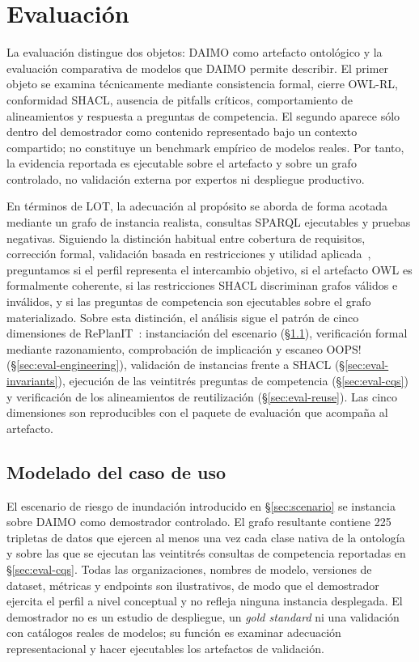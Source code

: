 \documentclass[Afour,sagev,times]{sagej}
\begin{document}
\section{Evaluación}\label{sec:eval}

La evaluación distingue dos objetos: DAIMO como artefacto ontológico y la evaluación comparativa de modelos que DAIMO permite describir. El primer objeto se examina técnicamente mediante consistencia formal, cierre OWL-RL, conformidad SHACL, ausencia de pitfalls críticos, comportamiento de alineamientos y respuesta a preguntas de competencia. El segundo aparece sólo dentro del demostrador como contenido representado bajo un contexto compartido; no constituye un benchmark empírico de modelos reales. Por tanto, la evidencia reportada es ejecutable sobre el artefacto y sobre un grafo controlado, no validación externa por expertos ni despliegue productivo.

En términos de LOT, la adecuación al propósito se aborda de forma acotada mediante un grafo de instancia realista, consultas SPARQL ejecutables y pruebas negativas. Siguiendo la distinción habitual entre cobertura de requisitos, corrección formal, validación basada en restricciones y utilidad aplicada~\cite{brank05}, preguntamos si el perfil representa el intercambio objetivo, si el artefacto OWL es formalmente coherente, si las restricciones SHACL discriminan grafos válidos e inválidos, y si las preguntas de competencia son ejecutables sobre el grafo materializado. Sobre esta distinción, el análisis sigue el patrón de cinco dimensiones de RePlanIT~\cite{kurteva}: instanciación del escenario (§\ref{sec:eval-usecase}), verificación formal mediante razonamiento, comprobación de implicación y escaneo OOPS! (§\ref{sec:eval-engineering}), validación de instancias frente a SHACL (§\ref{sec:eval-invariants}), ejecución de las veintitrés preguntas de competencia (§\ref{sec:eval-cqs}) y verificación de los alineamientos de reutilización (§\ref{sec:eval-reuse}). Las cinco dimensiones son reproducibles con el paquete de evaluación que acompaña al artefacto.

\subsection{Modelado del caso de uso}\label{sec:eval-usecase}

El escenario de riesgo de inundación introducido en §\ref{sec:scenario} se instancia sobre DAIMO como demostrador controlado. El grafo resultante contiene 225 tripletas de datos que ejercen al menos una vez cada clase nativa de la ontología y sobre las que se ejecutan las veintitrés consultas de competencia reportadas en §\ref{sec:eval-cqs}. Todas las organizaciones, nombres de modelo, versiones de dataset, métricas y endpoints son ilustrativos, de modo que el demostrador ejercita el perfil a nivel conceptual y no refleja ninguna instancia desplegada. El demostrador no es un estudio de despliegue, un \emph{gold standard} ni una validación con catálogos reales de modelos; su función es examinar adecuación representacional y hacer ejecutables los artefactos de validación.
\end{document}
